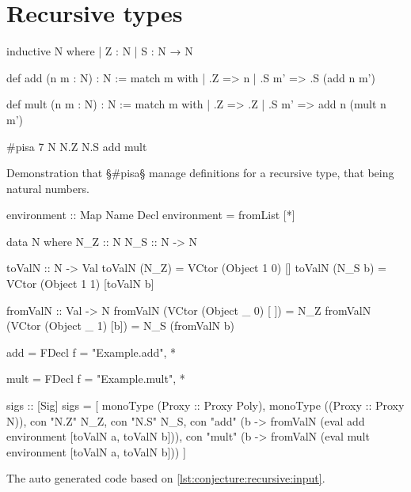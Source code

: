 \section{Recursive types}\label{app:recursive}

\begin{listing}[H]
\begin{LeanCode}
inductive N where
  | Z : N
  | S : N → N

def add (n m : N) : N :=
  match m with
  | .Z => n
  | .S m' => .S (add n m')

def mult (n m : N) : N :=
  match m with
  | .Z => .Z
  | .S m' => add n (mult n m')

#pisa 7 N N.Z N.S add mult
\end{LeanCode}
\caption
  [Benchmark with definitions for recursive natural numbers.]
  {Demonstration that §\#pisa§ manage definitions for a recursive type, that being natural numbers.}
\label{lst:conjecture:recursive:input}
\end{listing}

\newpage

\begin{listing}[H]
\begin{HaskellCode}
environment :: Map Name Decl
environment = fromList [*\truncated*]

data N where
  N_Z :: N
  N_S :: N -> N

toValN :: N -> Val
toValN (N_Z)   = VCtor (Object 1 0) []
toValN (N_S b) = VCtor (Object 1 1) [toValN b]

fromValN :: Val -> N
fromValN (VCtor (Object _ 0) [ ]) = N_Z
fromValN (VCtor (Object _ 1) [b]) = N_S (fromValN b)

add = FDecl {f = "Example.add", *\truncated*}

mult = FDecl {f = "Example.mult", *\truncated*}

sigs :: [Sig]
sigs =
  [ monoType (Proxy :: Proxy Poly),
    monoType ((Proxy :: Proxy N)),
    con "N.Z" N_Z,
    con "N.S" N_S,
    con "add" (\a b -> fromValN
      (eval add environment [toValN a, toValN b])),
    con "mult" (\a b -> fromValN
      (eval mult environment [toValN a, toValN b]))
  ]
\end{HaskellCode}
\caption {The auto generated code based on \cref{lst:conjecture:recursive:input}.}
\label{lst:conjecture:recursive:code}
\end{listing}

